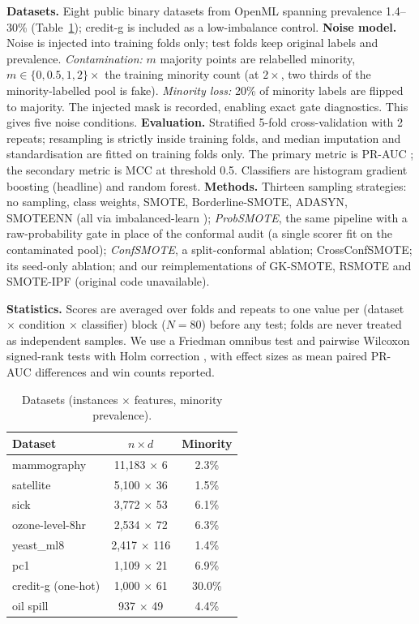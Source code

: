 \documentclass[10pt]{article} %
\begin{document}
\textbf{Datasets.} Eight public binary datasets from OpenML spanning prevalence 1.4--30\% (Table~\ref{tab:datasets}); credit-g is included as a low-imbalance control. \textbf{Noise model.} Noise is injected into training folds only; test folds keep original labels and prevalence. \emph{Contamination:} $m$ majority points are relabelled minority, $m \in \{0, 0.5, 1, 2\} \times$ the training minority count (at $2\times$, two thirds of the minority-labelled pool is fake). \emph{Minority loss:} 20\% of minority labels are flipped to majority. The injected mask is recorded, enabling exact gate diagnostics. This gives five noise conditions. \textbf{Evaluation.} Stratified 5-fold cross-validation with 2 repeats; resampling is strictly inside training folds, and median imputation and standardisation are fitted on training folds only. The primary metric is PR-AUC \citep{saito2015precision}; the secondary metric is MCC at threshold 0.5. Classifiers are histogram gradient boosting (headline) and random forest. \textbf{Methods.} Thirteen sampling strategies: no sampling, class weights, SMOTE, Borderline-SMOTE, ADASYN, SMOTEENN (all via imbalanced-learn \citep{lemaitre2017imbalanced}); \emph{ProbSMOTE}, the same pipeline with a raw-probability gate in place of the conformal audit (a single scorer fit on the contaminated pool); \emph{ConfSMOTE}, a split-conformal ablation; CrossConfSMOTE; its seed-only ablation; and our reimplementations of GK-SMOTE, RSMOTE and SMOTE-IPF (original code unavailable).

\textbf{Statistics.} Scores are averaged over folds and repeats to one value per (dataset $\times$ condition $\times$ classifier) block ($N=80$) before any test; folds are never treated as independent samples. We use a Friedman omnibus test and pairwise Wilcoxon signed-rank tests with Holm correction \citep{demsar2006statistical, holm1979simple}, with effect sizes as mean paired PR-AUC differences and win counts reported.

\begin{table}[t]
\caption{Datasets (instances $\times$ features, minority prevalence).}
\label{tab:datasets}
\begin{center}
\begin{tabular}{lcc}
\toprule
Dataset & $n \times d$ & Minority \\
\midrule
mammography & 11,183 $\times$ 6 & 2.3\% \\
satellite & 5,100 $\times$ 36 & 1.5\% \\
sick & 3,772 $\times$ 53 & 6.1\% \\
ozone-level-8hr & 2,534 $\times$ 72 & 6.3\% \\
yeast\_ml8 & 2,417 $\times$ 116 & 1.4\% \\
pc1 & 1,109 $\times$ 21 & 6.9\% \\
credit-g (one-hot) & 1,000 $\times$ 61 & 30.0\% \\
oil spill & 937 $\times$ 49 & 4.4\% \\
\bottomrule
\end{tabular}
\end{center}
\end{table}
\end{document}
